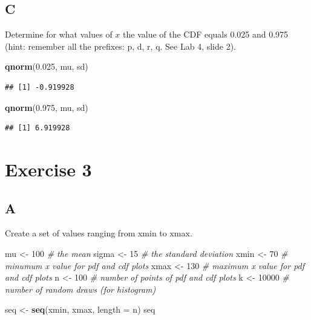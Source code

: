 \documentclass[
]{article}
\newenvironment{Shaded}{\begin{snugshade}}{\end{snugshade}}
\newcommand{\CommentTok}[1]{\textcolor[rgb]{0.56,0.35,0.01}{\textit{#1}}}
\newcommand{\DataTypeTok}[1]{\textcolor[rgb]{0.13,0.29,0.53}{#1}}
\newcommand{\DecValTok}[1]{\textcolor[rgb]{0.00,0.00,0.81}{#1}}
\newcommand{\FloatTok}[1]{\textcolor[rgb]{0.00,0.00,0.81}{#1}}
\newcommand{\KeywordTok}[1]{\textcolor[rgb]{0.13,0.29,0.53}{\textbf{#1}}}
\newcommand{\NormalTok}[1]{#1}
\newcommand{\StringTok}[1]{\textcolor[rgb]{0.31,0.60,0.02}{#1}}
\begin{document}
\hypertarget{c-1}{%
\subsection{C}\label{c-1}}

Determine for what values of \(x\) the value of the CDF equals 0.025 and
0.975 (hint: remember all the prefixes: p, d, r, q. See Lab 4, slide 2).

\begin{Shaded}
\begin{Highlighting}[]
\KeywordTok{qnorm}\NormalTok{(}\FloatTok{0.025}\NormalTok{, mu, sd)}
\end{Highlighting}
\end{Shaded}

\begin{verbatim}
## [1] -0.919928
\end{verbatim}

\begin{Shaded}
\begin{Highlighting}[]
\KeywordTok{qnorm}\NormalTok{(}\FloatTok{0.975}\NormalTok{, mu, sd)}
\end{Highlighting}
\end{Shaded}

\begin{verbatim}
## [1] 6.919928
\end{verbatim}

\hypertarget{exercise-3}{%
\section{Exercise 3}\label{exercise-3}}

\hypertarget{a-2}{%
\subsection{A}\label{a-2}}

Create a set of values ranging from xmin to xmax.

\begin{Shaded}
\begin{Highlighting}[]
\NormalTok{mu \textless{}{-}}\StringTok{ }\DecValTok{100} \CommentTok{\# the mean}
\NormalTok{sigma \textless{}{-}}\StringTok{ }\DecValTok{15} \CommentTok{\# the standard deviation}
\NormalTok{xmin \textless{}{-}}\StringTok{ }\DecValTok{70} \CommentTok{\# minumum x value for pdf and cdf plots}
\NormalTok{xmax \textless{}{-}}\StringTok{ }\DecValTok{130} \CommentTok{\# maximum x value for pdf and cdf plots}
\NormalTok{n \textless{}{-}}\StringTok{ }\DecValTok{100} \CommentTok{\# number of points of pdf and cdf plots}
\NormalTok{k \textless{}{-}}\StringTok{ }\DecValTok{10000} \CommentTok{\# number of random draws (for histogram)}

\NormalTok{seq \textless{}{-}}\StringTok{ }\KeywordTok{seq}\NormalTok{(xmin, xmax, }\DataTypeTok{length =}\NormalTok{ n)}
\NormalTok{seq}
\end{Highlighting}
\end{Shaded}
\end{document}
